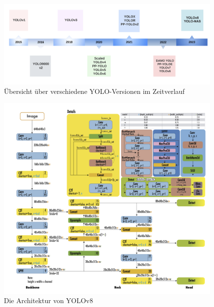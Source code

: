 {    \begin{figure}[h]
		\centering
		\includegraphics*[scale = 0.15, keepaspectratio]{images/YOLO/YOLO_timeline_vers.png}
		\caption[Übersicht über verschiedene YOLO Versionen im Zeitverlauf]{Übersicht über verschiedene YOLO-Versionen im Zeitverlauf \citep{Terven2023}}
		\label{YOLO_timeline_vers}
		\end{figure}

    \begin{figure}[h]
        \centering
        \includegraphics*[scale = 0.35, keepaspectratio]{images/YOLO/YOLOv8_Arch.png}
        \caption[Die Architektur von YOLOv8]{Die Architektur von YOLOv8 \citep{Terven2023}}
        \label{YOLOv8_Arch}
    \end{figure}


}
